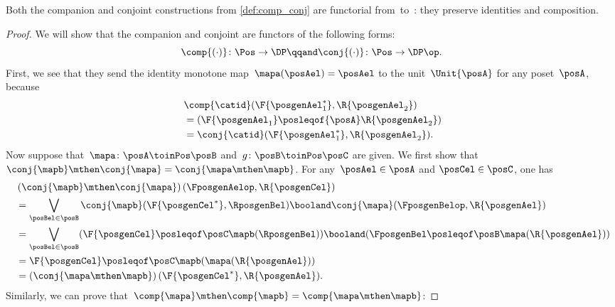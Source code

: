 \begin{lemma}
	\label{lem:comp_conj}
	Both the companion and conjoint constructions from \cref{def:comp_conj} are functorial from~\Pos to~\DP: they preserve identities and composition.
\end{lemma}
\begin{proof}
	We will show that the companion and conjoint are functors of the following forms:
	\begin{equation}
		\comp{(\cdot)}\colon\Pos\to\DP
		\qqand
		\conj{(\cdot)}\colon\Pos\to\DP\op.
	\end{equation}
	First, we see that they send the identity monotone map~$\mapa(\posAel)=\posAel$ to the unit~$\Unit{\posA }$ for any poset~$\posA$, because
	\begin{equation}
		\begin{aligned}
			~ & \comp{\catid}(\F{\posgenAel_1^*},\R{\posgenAel_2})     \\
			  & = (\F{\posgenAel_1} \posleqof{\posA} \R{\posgenAel_2}) \\
			  & =\conj{\catid}(\F{\posgenAel_1^*},\R{\posgenAel_2}).
		\end{aligned}
	\end{equation}
	Now suppose that~$\mapa\colon  \posA \toinPos \posB $ and~$g\colon \posB \toinPos \posC$ are given.
	We first show that $\conj{\mapb}\mthen\conj{\mapa}=\conj{\mapa\mthen \mapb}$.
	For any~$\posAel\in \posA$ and $\posCel\in \posC$, one has
	\begin{equation}
		\begin{aligned}
			~ & \left(\conj{\mapb}\mthen \conj{\mapa}\right)(\FposgenAelop,\R{\posgenCel})                                                               \\
			  & =\bigvee_{\posBel\in \posB} \conj{\mapb}(\F{\posgenCel^*},\RposgenBel)\booland\conj{\mapa}(\FposgenBelop,\R{\posgenAel})                 \\
			  & =\bigvee_{\posBel\in \posB} (\F{\posgenCel}\posleqof\posC \mapb(\RposgenBel)) \booland (\FposgenBel\posleqof\posB \mapa(\R{\posgenAel})) \\
			  & = \F{\posgenCel}\posleqof\posC \mapb(\mapa(\R{\posgenAel}))                                                                              \\
			  & =\left(\conj{\mapa\mthen \mapb}\right)(\F{\posgenCel^*},\R{\posgenAel}).
		\end{aligned}
	\end{equation}
	Similarly, we can prove that~$\comp{\mapa}\mthen \comp{\mapb}=\comp{\mapa\mthen \mapb}$:

\end{proof}
